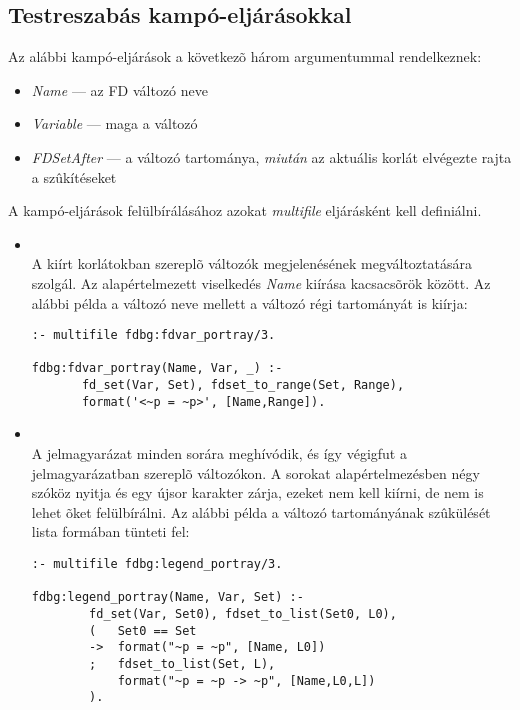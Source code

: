 \subsection{Testreszabás kampó-eljárásokkal}

Az alábbi kampó-eljárások a következõ három argumentummal rendelkeznek:

\begin{itemize}
\item \emph{Name} --- az FD változó neve
\item \emph{Variable} --- maga a változó
\item \emph{FDSetAfter} --- a változó tartománya, \emph{miután} az aktuális
  korlát elvégezte rajta a szûkítéseket
\end{itemize}

A kampó-eljárások felülbírálásához azokat \emph{multifile} eljárásként kell definiálni.

\begin{itemize}
\item {}\\
  A kiírt korlátokban szereplõ változók megjelenésének megváltoztatására
  szolgál. Az alapértelmezett viselkedés \textsl{Name} kiírása kacsacsõrök
  között. Az alábbi példa a változó neve mellett a változó régi tartományát is
  kiírja:

\begin{verbatim}
:- multifile fdbg:fdvar_portray/3.

fdbg:fdvar_portray(Name, Var, _) :-
       fd_set(Var, Set), fdset_to_range(Set, Range),
       format('<~p = ~p>', [Name,Range]).
\end{verbatim}

\item {}\\
  A jelmagyarázat minden sorára meghívódik, és így végigfut a jelmagyarázatban
  szereplõ változókon. A sorokat alapértelmezésben négy szóköz nyitja és egy
  újsor karakter zárja, ezeket nem kell kiírni, de nem is lehet õket felülbírálni.
  Az alábbi példa a változó tartományának szûkülését lista formában tünteti fel:

\begin{verbatim}
:- multifile fdbg:legend_portray/3.

fdbg:legend_portray(Name, Var, Set) :-
        fd_set(Var, Set0), fdset_to_list(Set0, L0),
        (   Set0 == Set
        ->  format("~p = ~p", [Name, L0])
        ;   fdset_to_list(Set, L),
            format("~p = ~p -> ~p", [Name,L0,L])
        ).
\end{verbatim}
\end{itemize}

